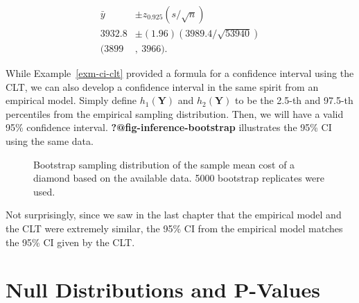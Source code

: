 \documentclass[
  letterpaper,
  DIV=11,
  numbers=noendperiod]{scrreprt}
\theoremstyle{definition}
\theoremstyle{plain}
\theoremstyle{definition}
\theoremstyle{remark}
\begin{document}
\[
\begin{aligned}
  \bar{y} &\pm z_{0.925} \left(s / \sqrt{n}\right) \\
  3932.8 &\pm (1.96) (3989.4 / \sqrt{53940}) \\
  (3899&,\ 3966).
\end{aligned}
\]

While Example~\ref{exm-ci-clt} provided a formula for a confidence
interval using the CLT, we can also develop a confidence interval in the
same spirit from an empirical model. Simply define \(h_1(\mathbf{Y})\)
and \(h_2(\mathbf{Y})\) to be the 2.5-th and 97.5-th percentiles from
the empirical sampling distribution. Then, we will have a valid 95\%
confidence interval. \textbf{?@fig-inference-bootstrap} illustrates the
95\% CI using the same data.

\begin{figure}


\caption{\label{fig-samplingdistributions-bootstrap}Bootstrap sampling
distribution of the sample mean cost of a diamond based on the available
data. 5000 bootstrap replicates were used.}

\end{figure}%

Not surprisingly, since we saw in the last chapter that the empirical
model and the CLT were extremely similar, the 95\% CI from the empirical
model matches the 95\% CI given by the CLT.

\section{Null Distributions and
P-Values}\label{null-distributions-and-p-values}
\end{document}
